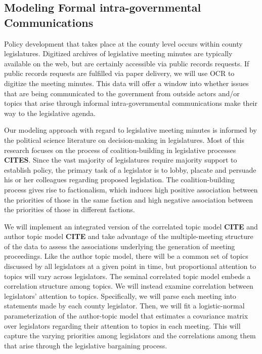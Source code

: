 \subsection{Modeling Formal intra-governmental Communications}

Policy development that takes place at the county level occurs within county legislatures. Digitized archives of legislative meeting minutes are typically available on the web, but are certainly accessible via public records requests. If public records requests are fulfilled via paper delivery, we will use OCR to digitize the meeting minutes. This data will offer a window into whether issues that are being communicated to the government from outside actors and/or topics that arise through informal intra-governmental communications make their way to the legislative agenda. 

Our modeling approach with regard to legislative meeting minutes is informed by the political science literature on decision-making in legislatures. Most of this research focuses on the process of coalition-building in legislative processes {\bf CITES}. Since the vast majority of legislatures require majority support to establish policy, the primary task of a legislator is to lobby, placate and persuade his or her colleagues regarding proposed legislation. The coalition-building process gives rise to factionalism, which induces high positive association between the priorities of those in the same faction and high negative association between the priorities of those in different factions. 

We will implement an integrated version of the correlated topic model {\bf CITE} and author topic model {\bf CITE} and take advantage of the multiple-meeting structure of the data to assess the associations underlying the generation of meeting proceedings. Like the author topic model,  there will be a common set of topics discussed by all legislators at a given point in time, but proportional attention to topics will vary across legislators. The seminal correlated topic model embeds a correlation structure among topics. We will instead examine correlation between legislators' attention to topics. Specifically, we will parse each meeting into statements made by each county legislator. Then, we will fit a logistic-normal parameterization of the author-topic model that estimates a covariance matrix over legislators regarding their attention to topics in each meeting. This will capture the varying priorities among legislators and the correlations among them that arise through the legislative bargaining process.

